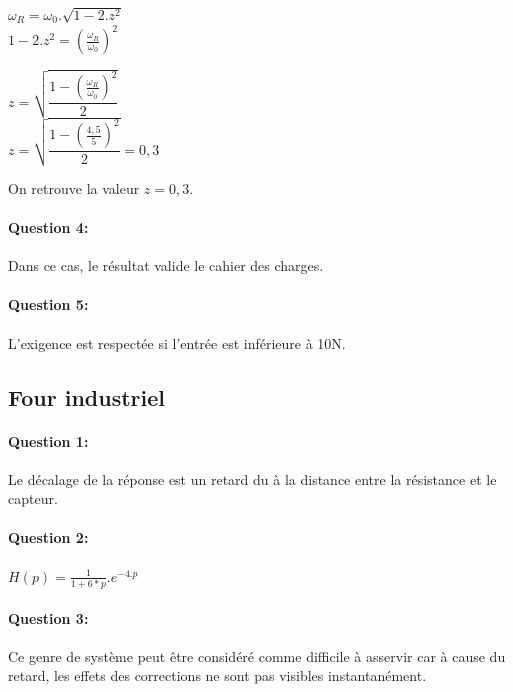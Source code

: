 \begin{minipage}{0.45\linewidth}
$\omega_R=\omega_0.\sqrt{1-2.z^2}$ \\
$1-2.z^2=\left(\frac{\omega_R}{\omega_0}\right)^2$
\end{minipage}\hfill
\begin{minipage}{0.45\linewidth}
$z=\sqrt{\dfrac{1-\left(\frac{\omega_R}{\omega_0}\right)^2}{2}}$\\
$z=\sqrt{\dfrac{1-\left(\frac{4,5}{5}\right)^2}{2}}=0,3$
\end{minipage}

On retrouve la valeur $z=0,3$.

\paragraph{Question 4:}

Dans ce cas, le résultat valide le cahier des charges.

\paragraph{Question 5:}

L'exigence est respectée si l'entrée est inférieure à 10N.

\subsection{Four industriel}

\paragraph{Question 1:}

Le décalage de la réponse est un retard du à la distance entre la résistance et le capteur.

\paragraph{Question 2:}

$H(p)=\frac{1}{1+6*p}.e^{-4.p}$

\paragraph{Question 3:}

Ce genre de système peut être considéré comme difficile à asservir car à cause du retard, les effets des corrections ne sont pas visibles instantanément.

